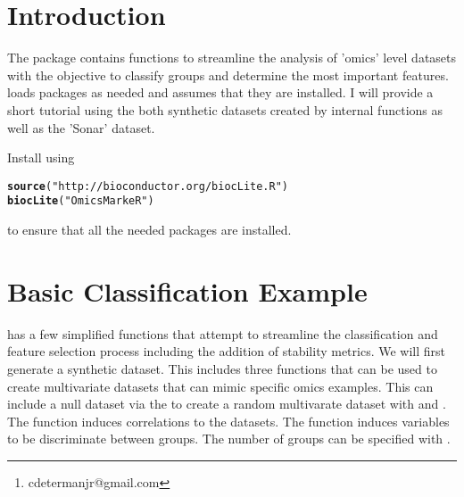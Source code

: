 \documentclass[12pt]{article}\usepackage[]{graphicx}\usepackage[usenames,dvipsnames]{color}
\author{Charles Determan Jr.\footnote{cdetermanjr@gmail.com}}
\makeatletter
\newcommand{\hlstr}[1]{\textcolor[rgb]{0.192,0.494,0.8}{#1}}%
\newcommand{\hlstd}[1]{\textcolor[rgb]{0.345,0.345,0.345}{#1}}%
\newcommand{\hlkwd}[1]{\textcolor[rgb]{0.737,0.353,0.396}{\textbf{#1}}}%
\newenvironment{kframe}{%
 \def\at@end@of@kframe{}%
 \ifinner\ifhmode%
  \def\at@end@of@kframe{\end{minipage}}%
  \begin{minipage}{\columnwidth}%
 \fi\fi%
 \def\FrameCommand##1{\hskip\@totalleftmargin \hskip-\fboxsep
 \colorbox{shadecolor}{##1}\hskip-\fboxsep
     \hskip-\linewidth \hskip-\@totalleftmargin \hskip\columnwidth}%
 \MakeFramed {\advance\hsize-\width
   \@totalleftmargin\z@ \linewidth\hsize
   \@setminipage}}%
 {\par\unskip\endMakeFramed%
 \at@end@of@kframe}
\newenvironment{knitrout}{}{} %
\makeatother
\begin{document}
\maketitle
\thispagestyle{empty}

\maketitle
\section{Introduction}
The  package contains functions to streamline the analysis
of 'omics' level datasets with the objective to classify groups and determine 
the most important features.  loads packages as needed and 
assumes that they are installed.  I will provide a short tutorial using the 
both synthetic datasets created by internal functions as well as the 'Sonar' 
dataset. 

Install  using  
\begin{knitrout}
\color{fgcolor}\begin{kframe}
\begin{alltt}
\hlkwd{source}\hlstd{(}\hlstr{"http://bioconductor.org/biocLite.R"}\hlstd{)}
\hlkwd{biocLite}\hlstd{(}\hlstr{"OmicsMarkeR"}\hlstd{)}
\end{alltt}
\end{kframe}
\end{knitrout}
    to ensure that all the needed packages are installed.

\newpage
\maketitle
\section{Basic Classification Example}
 has a few simplified functions that attempt to streamline 
the classification and feature selection process including the addition of 
stability metrics. We will first generate a synthetic dataset.  This includes 
three functions that can be used to create multivariate datasets that can 
mimic specific omics examples.  This can include a null dataset via the
 to create a random multivarate dataset with
 and .  The  
function induces correlations to the datasets.  The 
 function induces variables to be discriminate 
between groups.  The number of groups can be specified with . 
\end{document}
